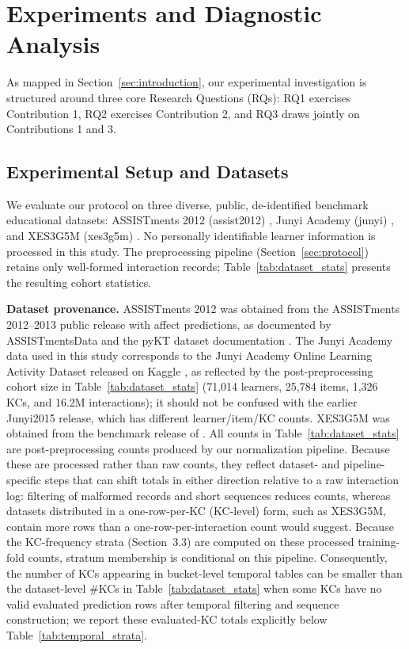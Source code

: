 \section{Experiments and Diagnostic Analysis}
\label{sec:experiments}

As mapped in Section~\ref{sec:introduction}, our experimental investigation is structured around three core Research Questions (RQs): RQ1 exercises Contribution 1, RQ2 exercises Contribution 2, and RQ3 draws jointly on Contributions 1 and 3.

\subsection{Experimental Setup and Datasets}
We evaluate our protocol on three diverse, public, de-identified benchmark educational datasets: ASSISTments 2012 (assist2012) \citep{assistments2012data,liu2022pykt}, Junyi Academy (junyi) \citep{junyi2019kaggle}, and XES3G5M (xes3g5m) \citep{liu2023xes3g5m}. No personally identifiable learner information is processed in this study. The preprocessing pipeline (Section~\ref{sec:protocol}) retains only well-formed interaction records; Table~\ref{tab:dataset_stats} presents the resulting cohort statistics.

\textbf{Dataset provenance.} ASSISTments 2012 was obtained from the ASSISTments 2012--2013 public release with affect predictions, as documented by ASSISTmentsData and the pyKT dataset documentation \citep{assistments2012data, liu2022pykt}. The Junyi Academy data used in this study corresponds to the Junyi Academy Online Learning Activity Dataset released on Kaggle \citep{junyi2019kaggle}, as reflected by the post-preprocessing cohort size in Table~\ref{tab:dataset_stats} (71,014 learners, 25,784 items, 1,326 KCs, and 16.2M interactions); it should not be confused with the earlier Junyi2015 release, which has different learner/item/KC counts. XES3G5M was obtained from the benchmark release of \citet{liu2023xes3g5m}. All counts in Table~\ref{tab:dataset_stats} are post-preprocessing counts produced by our normalization pipeline. Because these are processed rather than raw counts, they reflect dataset- and pipeline-specific steps that can shift totals in either direction relative to a raw interaction log: filtering of malformed records and short sequences reduces counts, whereas datasets distributed in a one-row-per-KC (KC-level) form, such as XES3G5M, contain more rows than a one-row-per-interaction count would suggest. Because the KC-frequency strata (Section~3.3) are computed on these processed training-fold counts, stratum membership is conditional on this pipeline. Consequently, the number of KCs appearing in bucket-level temporal tables can be smaller than the dataset-level \#KCs in Table~\ref{tab:dataset_stats} when some KCs have no valid evaluated prediction rows after temporal filtering and sequence construction; we report these evaluated-KC totals explicitly below Table~\ref{tab:temporal_strata}.

